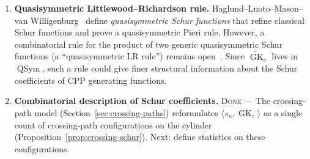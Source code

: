 \documentclass[11pt]{article}
\theoremstyle{plain}
\theoremstyle{definition}
\theoremstyle{remark}
\newcommand{\GK}{\operatorname{GK}}
\newcommand{\QSym}{\operatorname{QSym}}
\begin{document}
\begin{enumerate}
\item \textbf{Quasisymmetric Littlewood--Richardson rule.}
  Haglund--Luoto--Mason--van Willigenburg~\cite{haglund-luoto-mason-vw}
  define \emph{quasisymmetric Schur functions} that refine
  classical Schur functions and prove a quasisymmetric Pieri rule.
  However, a combinatorial rule for the product of two generic
  quasisymmetric Schur functions (a ``quasisymmetric LR rule'')
  remains open~\cite[p.~23]{haglund-luoto-mason-vw}.
  Since $\widetilde{\GK}_c$ lives in $\QSym$, such a rule
  could give finer structural information about the
  Schur coefficients of CPP generating functions.

\item \textbf{Combinatorial description of Schur coefficients.}
  \textsc{Done} --- The crossing-path model
  (Section~\ref{sec:crossing-paths}) reformulates
  $\langle s_\kappa, \GK_c \rangle$ as a single count of
  crossing-path configurations on the cylinder
  (Proposition~\ref{prop:crossing-schur}).
  Next: define statistics on these configurations.
\end{enumerate}

\end{document}
